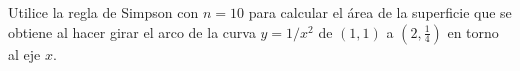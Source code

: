 \item Utilice la regla de Simpson con $n = 10$ para calcular el área de la superficie que se obtiene al hacer girar el arco de la curva $y = 1/x^2$ de $(1, 1)$ a $\left(2, \frac{1}{4}\right)$ en torno al eje $x$.

